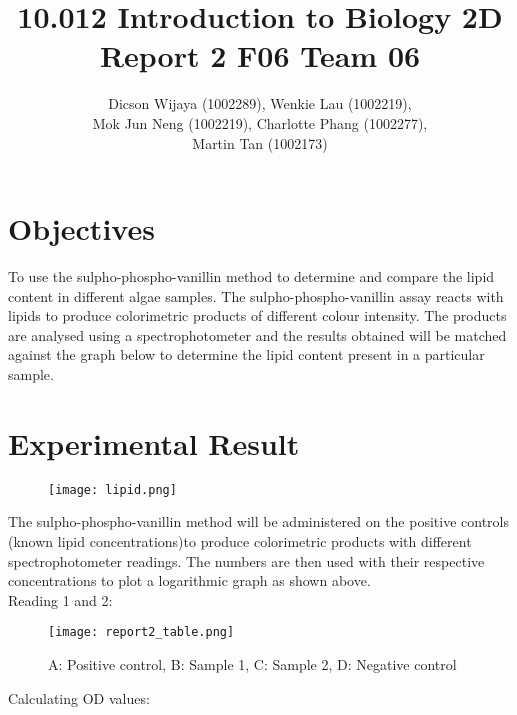 \documentclass[11.5pt,a4paper]{IEEEtran}
\author{Dicson Wijaya (1002289), Wenkie Lau (1002219), \\ Mok Jun Neng (1002219), Charlotte Phang (1002277), \\ Martin Tan (1002173)}
\title{10.012 Introduction to Biology 2D \\ Report 2 F06 Team 06}
\begin{document}
	
	\maketitle
	
	\section{Objectives}
	To use the sulpho-phospho-vanillin method to determine and compare the lipid content in different algae samples. The sulpho-phospho-vanillin assay reacts with lipids to produce colorimetric products of different colour intensity. The products are analysed using a spectrophotometer and the results obtained will be matched against the graph below to determine the lipid content present in a particular sample.
	
	\section{Experimental Result}
	\begin{figure}[H]
		\begin{center}
			\texttt{[image: lipid.png]}
			\label{fig:lipid}
		\end{center}
	\end{figure}
    \vspace{-8mm} The sulpho-phospho-vanillin method will be administered on the positive controls (known lipid concentrations)to produce colorimetric products with different spectrophotometer readings. The numbers are then used with their respective concentrations to plot a logarithmic graph as shown above. \vspace{-2mm} \\
    
    Reading 1 and 2:
    \begin{figure}[H]
    	\begin{center}
    		\texttt{[image: report2\_table.png]}
    		\caption{A: Positive control, B: Sample 1, C: Sample 2, D: Negative control}
    		\label{fig:table}
    	\end{center}
    \end{figure}
	
    Calculating OD values:
\end{document}
